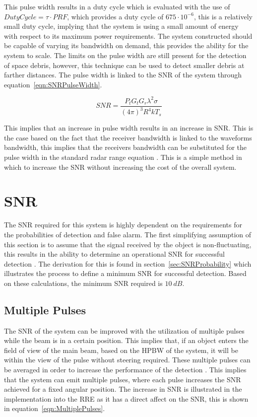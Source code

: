 \documentclass[11pt]{witseiepaper}
\begin{document}
\begin{bibunit}[witseie]
This pulse width results in a duty cycle which is evaluated with the use of $Duty Cycle = \tau \cdot PRF$, which provides a duty cycle of $675 \cdot 10^{-6}$, this is a relatively small duty cycle, implying that the system is using a small amount of energy with respect to its maximum power requirements.
The system constructed should be capable of varying its bandwidth on demand, this provides the ability for the system to scale. The limits on the pulse width are still present for the detection of space debris, however, this technique can be used to detect smaller debris at farther distances.
The pulse width is linked to the SNR of the system through equation~\ref{eqn:SNRPulseWidth}.

\begin{equation} \label{eqn:SNRPulseWidth}
SNR = \frac{P_{t} G_t G_r {\lambda^2} \sigma}{(4 \pi )^3 R^4 k T_s}
\end{equation}

This implies that an increase in pulse width results in an increase in SNR. This is the case based on the fact that the receiver bandwidth is linked to the waveforms bandwidth, this implies that the receivers bandwidth can be substituted for the pulse width in the standard radar range equation \cite[p.~776]{radarHandbook}.
This is a simple method in which to increase the SNR without increasing the cost of the overall system.



\section{SNR} \label{sec:SNR}
The SNR required for this system is highly dependent on the requirements for the probabilities of detection and false alarm. The first simplifying assumption of this section is to assume that the signal received by the object is non-fluctuating, this results in the ability to determine an operational SNR for successful detection \cite[p.~102-103]{radarHandbook}.
The derivation for this is found in section~\ref{sec:SNRProbability} which illustrates the process to define a minimum SNR for successful detection. Based on these calculations, the minimum SNR required is $10~dB$.

\subsection{Multiple Pulses} \label{sec:MultiplePulses}
The SNR of the system can be improved with the utilization of multiple pulses while the beam is in a certain position. This implies that, if an object enters the field of view of the main beam, based on the HPBW of the system, it will be within the view of the pulse without steering required.
These multiple pulses can be averaged in order to increase the performance of the detection \cite[p.~66]{radarHandbook}. This implies that the system can emit multiple pulses, where each pulse increases the SNR achieved for a fixed angular position.
The increase in SNR is illustrated in the implementation into the RRE as it has a direct affect on the SNR, this is shown in equation~\ref{eqn:MultiplePulses}.


\end{bibunit}
\end{document}
